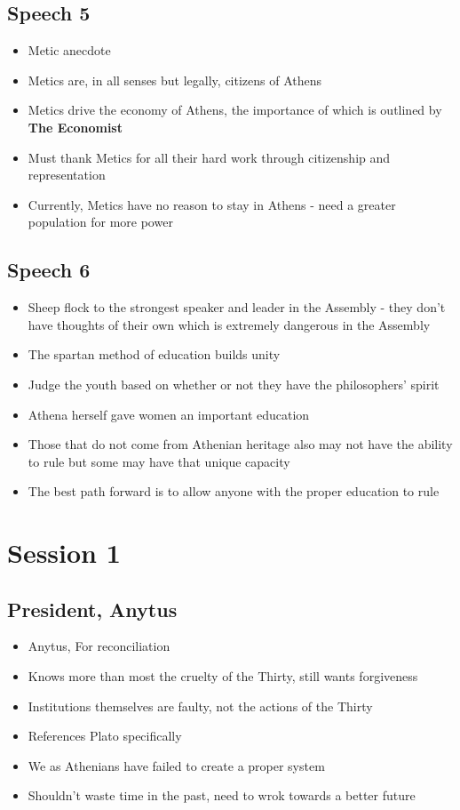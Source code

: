 \documentclass[11pt]{article}
\begin{document}
\subsection{Speech 5}
\label{sec:orgb51ed06}
\begin{itemize}
\item Metic anecdote
\item Metics are, in all senses but legally, citizens of Athens
\item Metics drive the economy of Athens, the importance of which is outlined by \textbf{\textbf{The Economist}}
\item Must thank Metics for all their hard work through citizenship and representation
\item Currently, Metics have no reason to stay in Athens - need a greater population for more power
\end{itemize}
\subsection{Speech 6}
\label{sec:org76c1f1e}
\begin{itemize}
\item Sheep flock to the strongest speaker and leader in the Assembly - they don't have thoughts of 
their own which is extremely dangerous in the Assembly
\item The spartan method of education builds unity
\item Judge the youth based on whether or not they have the philosophers' spirit
\item Athena herself gave women an important education
\item Those that do not come from Athenian heritage also may not have the ability to rule 
but some may have that unique capacity
\item The best path forward is to allow anyone with the proper education to rule
\end{itemize}
\section{Session 1}
\label{sec:orgc2b8acf}
\subsection{President, Anytus}
\label{sec:orgdf60906}
\begin{itemize}
\item Anytus, For reconciliation
\item Knows more than most the cruelty of the Thirty, still wants forgiveness
\item Institutions themselves are faulty, not the actions of the Thirty
\item References Plato specifically
\item We as Athenians have failed to create a proper system
\item Shouldn't waste time in the past, need to wrok towards a better future
\end{itemize}
\end{document}
